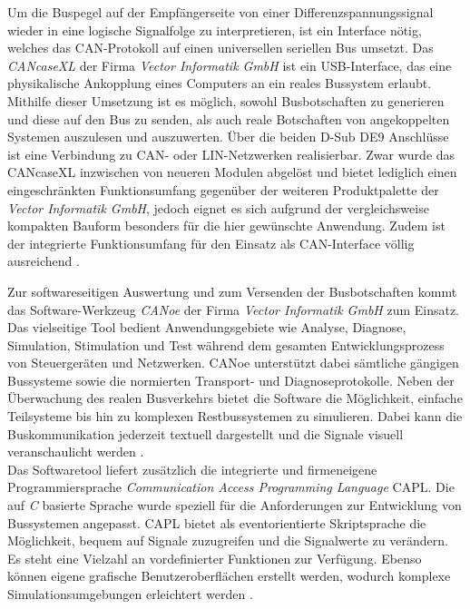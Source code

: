 Um die Buspegel auf der Empfängerseite von einer Differenzspannungssignal wieder in eine logische Signalfolge zu interpretieren, ist ein Interface nötig, welches das CAN-Protokoll auf einen universellen seriellen Bus umsetzt. Das \emph{CANcaseXL} der Firma \emph{Vector Informatik GmbH} ist ein USB-Interface, das eine physikalische Ankopplung eines Computers an ein reales Bussystem erlaubt. Mithilfe dieser Umsetzung ist es möglich, sowohl Busbotschaften zu generieren und diese auf den Bus zu senden, als auch reale Botschaften von angekoppelten Systemen auszulesen und auszuwerten. Über die beiden D-Sub DE9 Anschlüsse ist eine Verbindung zu \acs{CAN}- oder \acs{LIN}-Netzwerken realisierbar. Zwar wurde das CANcaseXL inzwischen von neueren Modulen abgelöst und bietet lediglich einen eingeschränkten Funktionsumfang gegenüber der weiteren Produktpalette der \emph{Vector Informatik GmbH}, jedoch eignet es sich aufgrund der vergleichsweise kompakten Bauform besonders für die hier gewünschte Anwendung. Zudem ist der integrierte Funktionsumfang für den Einsatz als \acs{CAN}-Interface völlig ausreichend \cite{VectorInformatikGmbH.2015}.

Zur softwareseitigen Auswertung und zum Versenden der Busbotschaften kommt das Software-Werkzeug \emph{CANoe} der Firma \emph{Vector Informatik GmbH} zum Einsatz. Das vielseitige Tool bedient Anwendungsgebiete wie Analyse, Diagnose, Simulation, Stimulation und Test während dem gesamten Entwicklungsprozess von Steuergeräten und Netzwerken. CANoe unterstützt dabei sämtliche gängigen Bussysteme sowie die normierten Transport- und Diagnoseprotokolle. Neben der Überwachung des realen Busverkehrs bietet die Software die Möglichkeit, einfache Teilsysteme bis hin zu komplexen Restbussystemen zu simulieren. Dabei kann die Buskommunikation jederzeit textuell dargestellt und die Signale visuell veranschaulicht werden \cite{VectorInformatikGmbH.2018}.\\
Das Softwaretool liefert zusätzlich die integrierte und firmeneigene Programmiersprache \emph{Communication Access Programming Language} \acs{CAPL}. Die auf \emph{C} basierte Sprache wurde speziell für die Anforderungen zur Entwicklung von Bussystemen angepasst. \acs{CAPL} bietet als eventorientierte Skriptsprache die Möglichkeit, bequem auf Signale zuzugreifen und die Signalwerte zu verändern. Es steht eine Vielzahl an vordefinierter Funktionen zur Verfügung. Ebenso können eigene grafische Benutzeroberflächen erstellt werden, wodurch komplexe Simulationsumgebungen erleichtert werden \cite{VectorInformatikGmbH.07.08.2017}. 


